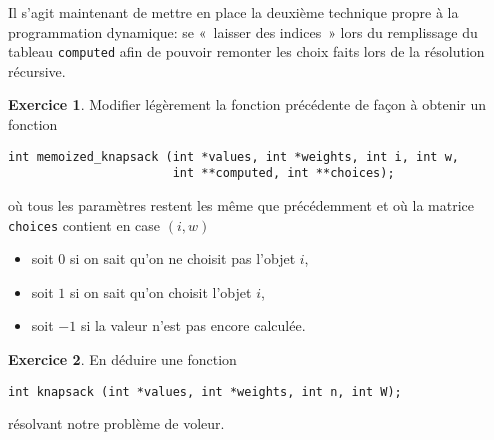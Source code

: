 \documentclass[french,a4paper]{article}
\theoremstyle{definition}
\newtheorem{exercise}{Exercice}
\theoremstyle{remark}
\newcommand{\inlinec}[1]{\lstinline[style=C]°#1°}
\begin{document}
Il s'agit maintenant de mettre en place la deuxième technique propre à
la programmation dynamique: se «~laisser des indices~» lors du
remplissage du tableau \inlinec{computed} afin de pouvoir remonter les
choix faits lors de la résolution récursive.

\begin{exercise}
  Modifier légèrement la fonction précédente de façon à obtenir un
  fonction
\begin{lstlisting}
int memoized_knapsack (int *values, int *weights, int i, int w,
                       int **computed, int **choices);
\end{lstlisting}
  où tous les paramètres restent les même que précédemment et où la
  matrice \inlinec{choices} contient en case $(i,w)$
  \begin{itemize}
  \item soit $0$ si on sait qu'on ne choisit pas l'objet $i$,
  \item soit $1$ si on sait qu'on choisit l'objet $i$,
  \item soit $-1$ si la valeur n'est pas encore calculée.
  \end{itemize}
\end{exercise}

\begin{exercise}
  En déduire une fonction
\begin{lstlisting}
int knapsack (int *values, int *weights, int n, int W);
\end{lstlisting}
  résolvant notre problème de voleur.
\end{exercise}
\end{document}
